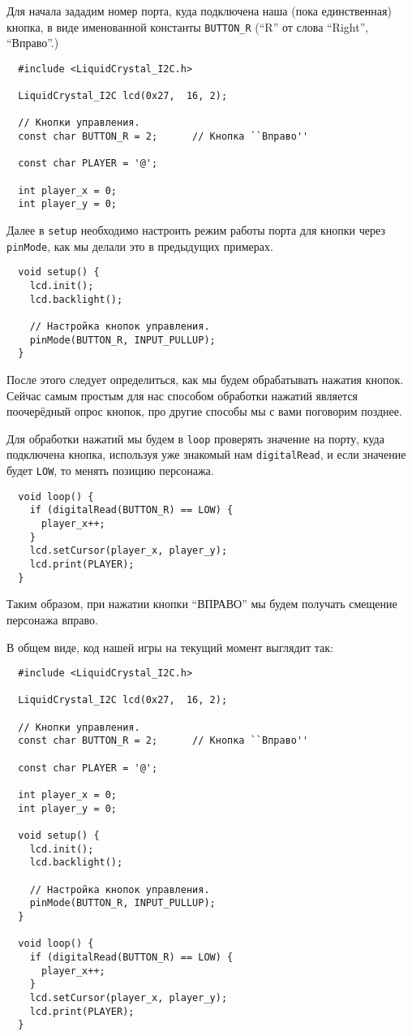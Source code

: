 \documentclass[../sparc.tex]{subfiles}
\begin{document}
Для начала зададим номер порта, куда подключена наша (пока единственная) кнопка,
в виде именованной константы \texttt{BUTTON\_R} (``R'' от слова ``Right'',
``Вправо''.)

\begin{verbatim}
  #include <LiquidCrystal_I2C.h>

  LiquidCrystal_I2C lcd(0x27,  16, 2);

  // Кнопки управления.
  const char BUTTON_R = 2;      // Кнопка ``Вправо''

  const char PLAYER = '@';

  int player_x = 0;
  int player_y = 0;
\end{verbatim}

Далее в \texttt{setup} необходимо настроить режим работы порта для кнопки через
\texttt{pinMode}, как мы делали это в предыдущих примерах.

\begin{verbatim}
  void setup() {
    lcd.init();
    lcd.backlight();

    // Настройка кнопок управления.
    pinMode(BUTTON_R, INPUT_PULLUP);
  }
\end{verbatim}

После этого следует определиться, как мы будем обрабатывать нажатия кнопок.
Сейчас самым простым для нас способом обработки нажатий является поочерёдный
опрос кнопок, про другие способы мы с вами поговорим позднее.

Для обработки нажатий мы будем в \texttt{loop} проверять значение на порту, куда
подключена кнопка, используя уже знакомый нам \texttt{digitalRead}, и если
значение будет \texttt{LOW}, то менять позицию персонажа.

\begin{verbatim}
  void loop() {
    if (digitalRead(BUTTON_R) == LOW) {
      player_x++;
    }
    lcd.setCursor(player_x, player_y);
    lcd.print(PLAYER);
  }
\end{verbatim}

Таким образом, при нажатии кнопки ``ВПРАВО'' мы будем получать смещение
персонажа вправо.

В общем виде, код нашей игры на текущий момент выглядит так:

\begin{verbatim}
  #include <LiquidCrystal_I2C.h>

  LiquidCrystal_I2C lcd(0x27,  16, 2);

  // Кнопки управления.
  const char BUTTON_R = 2;      // Кнопка ``Вправо''

  const char PLAYER = '@';

  int player_x = 0;
  int player_y = 0;

  void setup() {
    lcd.init();
    lcd.backlight();

    // Настройка кнопок управления.
    pinMode(BUTTON_R, INPUT_PULLUP);
  }

  void loop() {
    if (digitalRead(BUTTON_R) == LOW) {
      player_x++;
    }
    lcd.setCursor(player_x, player_y);
    lcd.print(PLAYER);
  }
\end{verbatim}
\end{document}

